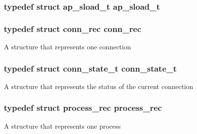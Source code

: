 \subsubsection[{\texorpdfstring{ap\+\_\+sload\+\_\+t}{ap_sload_t}}]{\setlength{\rightskip}{0pt plus 5cm}typedef struct {\bf ap\+\_\+sload\+\_\+t} {\bf ap\+\_\+sload\+\_\+t}}\hypertarget{group__APACHE__CORE__DAEMON_ga221df691a601284059c96279ede3855e}{}\label{group__APACHE__CORE__DAEMON_ga221df691a601284059c96279ede3855e}
\subsubsection[{\texorpdfstring{conn\+\_\+rec}{conn_rec}}]{\setlength{\rightskip}{0pt plus 5cm}typedef struct {\bf conn\+\_\+rec} {\bf conn\+\_\+rec}}\hypertarget{group__APACHE__CORE__DAEMON_ga304420d5069e376de5301b547155ee12}{}\label{group__APACHE__CORE__DAEMON_ga304420d5069e376de5301b547155ee12}
A structure that represents one connection 
\subsubsection[{\texorpdfstring{conn\+\_\+state\+\_\+t}{conn_state_t}}]{\setlength{\rightskip}{0pt plus 5cm}typedef struct {\bf conn\+\_\+state\+\_\+t} {\bf conn\+\_\+state\+\_\+t}}\hypertarget{group__APACHE__CORE__DAEMON_ga0d451c1a417b63673880a52c42bd0ace}{}\label{group__APACHE__CORE__DAEMON_ga0d451c1a417b63673880a52c42bd0ace}
A structure that represents the status of the current connection 
\subsubsection[{\texorpdfstring{process\+\_\+rec}{process_rec}}]{\setlength{\rightskip}{0pt plus 5cm}typedef struct {\bf process\+\_\+rec} {\bf process\+\_\+rec}}\hypertarget{group__APACHE__CORE__DAEMON_gac1d3451ddc972f4a6fd73acf7f47d1fb}{}\label{group__APACHE__CORE__DAEMON_gac1d3451ddc972f4a6fd73acf7f47d1fb}
A structure that represents one process 
